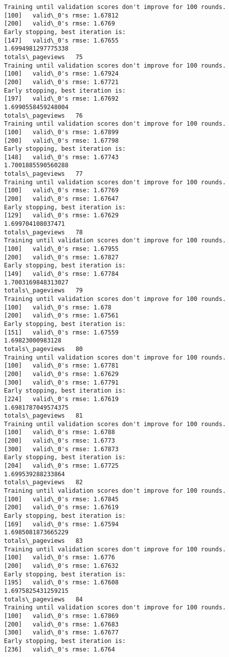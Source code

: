 \documentclass[11pt]{article}
\begin{document}
\begin{Verbatim}[commandchars=\\\{\}]
Training until validation scores don't improve for 100 rounds.
[100]	valid\_0's rmse: 1.67812
[200]	valid\_0's rmse: 1.6769
Early stopping, best iteration is:
[147]	valid\_0's rmse: 1.67655
1.6994981297775338
totals\_pageviews   75
Training until validation scores don't improve for 100 rounds.
[100]	valid\_0's rmse: 1.67924
[200]	valid\_0's rmse: 1.67721
Early stopping, best iteration is:
[197]	valid\_0's rmse: 1.67692
1.6990558459248004
totals\_pageviews   76
Training until validation scores don't improve for 100 rounds.
[100]	valid\_0's rmse: 1.67899
[200]	valid\_0's rmse: 1.67798
Early stopping, best iteration is:
[148]	valid\_0's rmse: 1.67743
1.7001885590560288
totals\_pageviews   77
Training until validation scores don't improve for 100 rounds.
[100]	valid\_0's rmse: 1.67769
[200]	valid\_0's rmse: 1.67647
Early stopping, best iteration is:
[129]	valid\_0's rmse: 1.67629
1.699704108037471
totals\_pageviews   78
Training until validation scores don't improve for 100 rounds.
[100]	valid\_0's rmse: 1.67955
[200]	valid\_0's rmse: 1.67827
Early stopping, best iteration is:
[149]	valid\_0's rmse: 1.67784
1.7003169848313027
totals\_pageviews   79
Training until validation scores don't improve for 100 rounds.
[100]	valid\_0's rmse: 1.678
[200]	valid\_0's rmse: 1.67561
Early stopping, best iteration is:
[151]	valid\_0's rmse: 1.67559
1.69823000983128
totals\_pageviews   80
Training until validation scores don't improve for 100 rounds.
[100]	valid\_0's rmse: 1.67781
[200]	valid\_0's rmse: 1.67629
[300]	valid\_0's rmse: 1.67791
Early stopping, best iteration is:
[224]	valid\_0's rmse: 1.67619
1.6981787049574375
totals\_pageviews   81
Training until validation scores don't improve for 100 rounds.
[100]	valid\_0's rmse: 1.6788
[200]	valid\_0's rmse: 1.6773
[300]	valid\_0's rmse: 1.67873
Early stopping, best iteration is:
[204]	valid\_0's rmse: 1.67725
1.699539288233864
totals\_pageviews   82
Training until validation scores don't improve for 100 rounds.
[100]	valid\_0's rmse: 1.67845
[200]	valid\_0's rmse: 1.67619
Early stopping, best iteration is:
[169]	valid\_0's rmse: 1.67594
1.6985081873665229
totals\_pageviews   83
Training until validation scores don't improve for 100 rounds.
[100]	valid\_0's rmse: 1.6776
[200]	valid\_0's rmse: 1.67632
Early stopping, best iteration is:
[195]	valid\_0's rmse: 1.67608
1.6975825431259215
totals\_pageviews   84
Training until validation scores don't improve for 100 rounds.
[100]	valid\_0's rmse: 1.67869
[200]	valid\_0's rmse: 1.67683
[300]	valid\_0's rmse: 1.67677
Early stopping, best iteration is:
[236]	valid\_0's rmse: 1.6764

\end{Verbatim}
\end{document}
